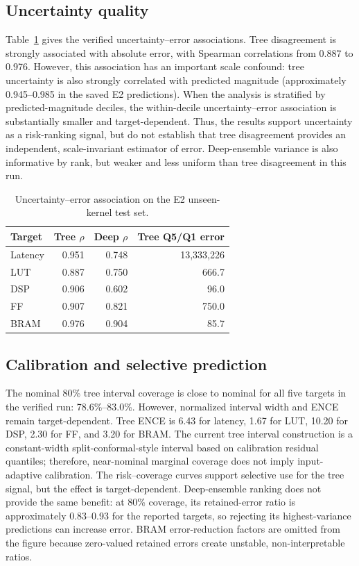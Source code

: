 \documentclass[conference]{IEEEtran}
\begin{document}
\subsection{Uncertainty quality}
Table~\ref{tab:uq} gives the verified uncertainty--error associations. Tree disagreement is strongly associated with absolute error, with Spearman correlations from 0.887 to 0.976. However, this association has an important scale confound: tree uncertainty is also strongly correlated with predicted magnitude (approximately 0.945--0.985 in the saved E2 predictions). When the analysis is stratified by predicted-magnitude deciles, the within-decile uncertainty--error association is substantially smaller and target-dependent. Thus, the results support uncertainty as a risk-ranking signal, but do not establish that tree disagreement provides an independent, scale-invariant estimator of error. Deep-ensemble variance is also informative by rank, but weaker and less uniform than tree disagreement in this run.

\begin{table}[t]
\centering
\caption{Uncertainty--error association on the E2 unseen-kernel test set.}
\label{tab:uq}
\begin{tabular}{lrrr}
\toprule
Target & Tree $\rho$ & Deep $\rho$ & Tree Q5/Q1 error\\
\midrule
Latency & 0.951 & 0.748 & 13,333,226\\
LUT & 0.887 & 0.750 & 666.7\\
DSP & 0.906 & 0.602 & 96.0\\
FF & 0.907 & 0.821 & 750.0\\
BRAM & 0.976 & 0.904 & 85.7\\
\bottomrule
\end{tabular}
\end{table}

\subsection{Calibration and selective prediction}
The nominal 80\% tree interval coverage is close to nominal for all five targets in the verified run: 78.6\%--83.0\%. However, normalized interval width and ENCE remain target-dependent. Tree ENCE is 6.43 for latency, 1.67 for LUT, 10.20 for DSP, 2.30 for FF, and 3.20 for BRAM. The current tree interval construction is a constant-width split-conformal-style interval based on calibration residual quantiles; therefore, near-nominal marginal coverage does not imply input-adaptive calibration. The risk--coverage curves support selective use for the tree signal, but the effect is target-dependent. Deep-ensemble ranking does not provide the same benefit: at 80\% coverage, its retained-error ratio is approximately 0.83--0.93 for the reported targets, so rejecting its highest-variance predictions can increase error. BRAM error-reduction factors are omitted from the figure because zero-valued retained errors create unstable, non-interpretable ratios.
\end{document}
